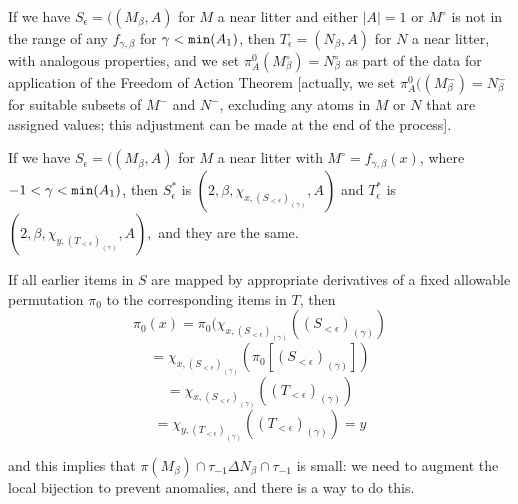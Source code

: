 \documentclass[112pt]{article}
\begin{document}
\begin{description}
If we have $S_\epsilon = ((M_\beta,A)$ for $M$ a near litter and either $|A|=1$ or $M^\circ$ is not in the range of any $f_{\gamma,\beta}$ for $\gamma<{\tt min}(A_1)$, then $T_\epsilon = (N_\beta,A)$ for $N$ a near litter, with analogous properties, and we set $\pi^0_A(M^\circ_\beta) = N^\circ_\beta$  as part of the data for application of the Freedom of Action Theorem [actually, we set $\pi^0_A((M^-_\beta) = N^-_\beta$  for suitable subsets of $M^-$ and $N^-$, excluding any atoms in $M$ or $N$ that are assigned values;  this adjustment can be made at the end of the process].


If we have $S_\epsilon= ((M_\beta,A)$ for $M$ a near litter with $M^\circ = f_{\gamma,\beta}(x)$, where $-1<\gamma<{\tt min}(A_1)$,
then $S^*_\epsilon$ is $(2,\beta,\chi_{x,(S_{<\epsilon})_{(\gamma)}},A)$ and $T^*_\epsilon$ is $(2,\beta,\chi_{y,(T_{<\epsilon})_{(\gamma)}},A),$ and they are the same.

If all earlier items in $S$ are mapped by appropriate derivatives of a fixed allowable permutation $\pi_0$ to the corresponding items in $T$, then
$$\pi_0(x) = \pi_0(\chi_{x,(S_{<\epsilon})_{(\gamma)}}((S_{<\epsilon})_{(\gamma)}) $$ $$ = \chi_{x,(S_{<\epsilon})_{(\gamma)}}(\pi_0[(S_{<\epsilon})_{(\gamma)}])$$ $$ = \chi_{x,(S_{<\epsilon})_{(\gamma)}}((T_{<\epsilon})_{(\gamma)}) $$ $$= \chi_{y,(T_{<\epsilon})_{(\gamma)}}((T_{<\epsilon})_{(\gamma)})=y$$

and this implies that $\pi(M_\beta)\cap \tau_{-1} \Delta N_\beta\cap \tau_{-1}$ is small:  we need to augment the local bijection to prevent anomalies, and there is a way to do this.


\end{description}
\end{document}
